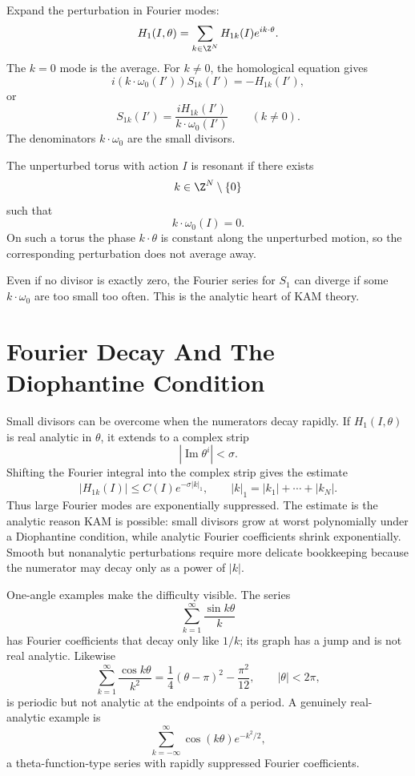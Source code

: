 Expand the perturbation in Fourier modes:
\[
  H_1(I,\theta)=\sum_{k\in\Z^N} H_{1k}(I)e^{ik\cdot\theta}.
\]
The \(k=0\) mode is the average. For \(k\neq0\), the homological equation gives
\[
  i(k\cdot\omega_0(I'))S_{1k}(I')=-H_{1k}(I'),
\]
or
\[
  \boxed{
  S_{1k}(I')
  =
  \frac{iH_{1k}(I')}{k\cdot\omega_0(I')}
  \qquad (k\neq0).
  }
\]
The denominators \(k\cdot\omega_0\) are the small divisors.

\begin{definition}
The unperturbed torus with action \(I\) is resonant if there exists
\[
  k\in\Z^N\setminus\{0\}
\]
such that
\[
  k\cdot\omega_0(I)=0.
\]
On such a torus the phase \(k\cdot\theta\) is constant along the unperturbed
motion, so the corresponding perturbation does not average away.
\end{definition}

Even if no divisor is exactly zero, the Fourier series for \(S_1\) can diverge
if some \(k\cdot\omega_0\) are too small too often. This is the analytic heart
of KAM theory.

\section{Fourier Decay And The Diophantine Condition}
\label{sec:diophantine-condition}

Small divisors can be overcome when the numerators decay rapidly. If
\(H_1(I,\theta)\) is real analytic in \(\theta\), it extends to a complex strip
\[
  |\operatorname{Im}\theta^i|<\sigma.
\]
Shifting the Fourier integral into the complex strip gives the estimate
\[
  |H_{1k}(I)|\leq C(I)e^{-\sigma |k|_1},
  \qquad
  |k|_1=|k_1|+\cdots+|k_N|.
\]
Thus large Fourier modes are exponentially suppressed.
The estimate is the analytic reason KAM is possible: small divisors grow at
worst polynomially under a Diophantine condition, while analytic Fourier
coefficients shrink exponentially. Smooth but nonanalytic perturbations require
more delicate bookkeeping because the numerator may decay only as a power of
\(|k|\).

\begin{example}
One-angle examples make the difficulty visible. The series
\[
  \sum_{k=1}^{\infty}\frac{\sin k\theta}{k}
\]
has Fourier coefficients that decay only like \(1/k\); its graph has a jump and
is not real analytic. Likewise
\[
  \sum_{k=1}^{\infty}\frac{\cos k\theta}{k^2}
  =
  \frac14(\theta-\pi)^2-\frac{\pi^2}{12},
  \qquad |\theta|<2\pi,
\]
is periodic but not analytic at the endpoints of a period. A genuinely
real-analytic example is
\[
  \sum_{k=-\infty}^{\infty}\cos(k\theta)e^{-k^2/2},
\]
a theta-function-type series with rapidly suppressed Fourier coefficients.
\end{example}

